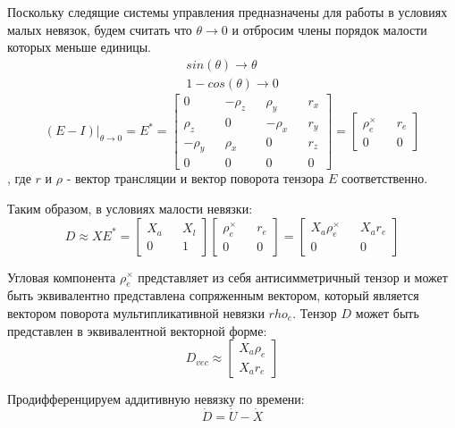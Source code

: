 \documentclass[a4paper]{article}
\begin{document}
Поскольку следящие системы управления предназначены для работы в условиях малых невязок, будем считать что $\theta \rightarrow 0$ и отбросим члены порядок малости которых меньше единицы.
\begin{eqnarray}
sin(\theta) \rightarrow \theta\\
1 - cos(\theta) \rightarrow 0
\end{eqnarray}
\begin{equation}
(E - I)|_{\theta\rightarrow0} = E^* = 
\begin{bmatrix}
0         && -\rho_z &&  \rho_y && r_x\\
 \rho_z && 0         && -\rho_x && r_y\\
-\rho_y &&  \rho_x && 0         && r_z\\
0&&0&&0&&0
\end{bmatrix} = \begin{bmatrix}\rho_e^\times&&r_e\\0&&0\end{bmatrix}
\end{equation}
, где $r$ и $\rho$ - вектор трансляции и вектор поворота тензора $E$ соответственно.

Таким образом, в условиях малости невязки:
\begin{equation} D \approx X E^* = \begin{bmatrix}X_a&&X_l\\0&&1\end{bmatrix} \begin{bmatrix}\rho_e^\times&&r_e\\0&&0\end{bmatrix} = \begin{bmatrix}X_a\rho_e^\times&&X_ar_e\\0&&0\end{bmatrix} \end{equation}

Угловая компонента $\rho_e^\times$ представляет из себя антисимметричный тензор и может быть эквивалентно представлена сопряженным вектором, который является вектором поворота мультипликативной невязки $rho_e$. Тензор $D$ может быть представлен в эквивалентной векторной форме:
\begin{equation} D_{vec} \approx \begin{bmatrix}X_a\rho_e\\X_ar_e\end{bmatrix} \end{equation}

Продифференцируем аддитивную невязку по времени:
\begin{equation} \dot{D} = \dot{U} -\dot{X} \end{equation}
\end{document}
